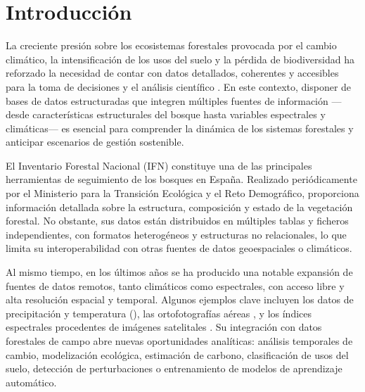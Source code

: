 \section{Introducción}


La creciente presión sobre los ecosistemas forestales provocada por el cambio climático, la intensificación de los usos del suelo y la pérdida de biodiversidad ha reforzado la necesidad de contar con datos detallados, coherentes y accesibles para la toma de decisiones y el análisis científico \cite{cmnucc1992, kioto1997}. En este contexto, disponer de bases de datos estructuradas que integren múltiples fuentes de información —desde características estructurales del bosque hasta variables espectrales y climáticas— es esencial para comprender la dinámica de los sistemas forestales y anticipar escenarios de gestión sostenible.

\medskip

El Inventario Forestal Nacional (IFN) \cite{ifn} constituye una de las principales herramientas de seguimiento de los bosques en España. Realizado periódicamente por el Ministerio para la Transición Ecológica y el Reto Demográfico, proporciona información detallada sobre la estructura, composición y estado de la vegetación forestal. No obstante, sus datos están distribuidos en múltiples tablas y ficheros independientes, con formatos heterogéneos y estructuras no relacionales, lo que limita su interoperabilidad con otras fuentes de datos geoespaciales o climáticos.

\medskip

Al mismo tiempo, en los últimos años se ha producido una notable expansión de fuentes de datos remotos, tanto climáticos como espectrales, con acceso libre y alta resolución espacial y temporal. Algunos ejemplos clave incluyen los datos de precipitación y temperatura (\cite{copuernicus_temps, copernicus_pr}), las ortofotografías aéreas \cite{ign_pnoa}, y los índices espectrales procedentes de imágenes satelitales \cite{landsat5_data, landsat7_data, sentinel_hub_ndii, eos_indices_vegetacion}. Su integración con datos forestales de campo abre nuevas oportunidades analíticas: análisis temporales de cambio, modelización ecológica, estimación de carbono, clasificación de usos del suelo, detección de perturbaciones o entrenamiento de modelos de aprendizaje automático.

